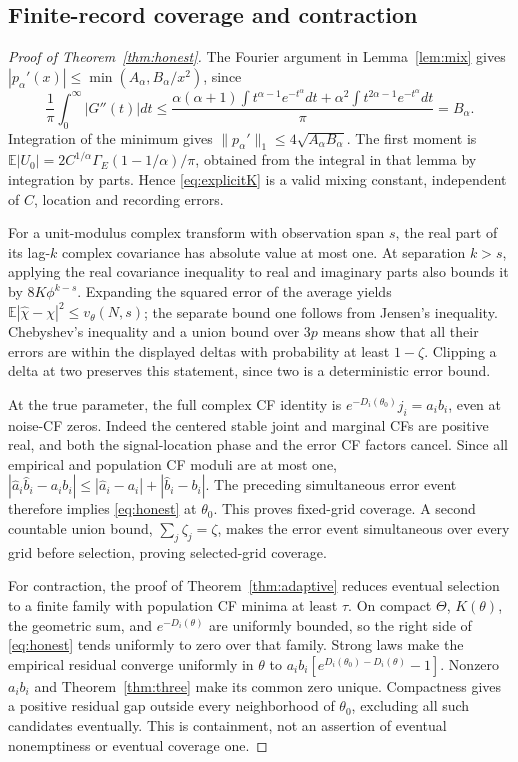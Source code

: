 \documentclass[11pt,a4paper]{article}
\theoremstyle{remark}\newtheorem{remark}[theorem]{Remark}
\newcommand{\E}{\mathbb E}\newcommand{\Pp}{\mathbb P}
\begin{document}
\subsection{Finite-record coverage and contraction}\label{proof:honest}
\begin{proof}[Proof of Theorem~\ref{thm:honest}]
The Fourier argument in Lemma~\ref{lem:mix} gives
$|p_\alpha'(x)|\le\min(A_\alpha,B_\alpha/x^2)$, since
\[
\frac1\pi\int_0^\infty|G''(t)|dt
\le\frac{\alpha(\alpha+1)\int t^{\alpha-1}e^{-t^\alpha}dt+
\alpha^2\int t^{2\alpha-1}e^{-t^\alpha}dt}{\pi}=B_\alpha.
\]
Integration of the minimum gives $\|p_\alpha'\|_1\le4\sqrt{A_\alpha B_\alpha}$. The first moment is
$\E|U_0|=2C^{1/\alpha}\Gamma_{\!E}(1-1/\alpha)/\pi$, obtained from the integral in that lemma by integration by parts. Hence \eqref{eq:explicitK} is a valid mixing constant, independent of $C$, location and recording errors.

For a unit-modulus complex transform with observation span $s$, the real part of its lag-$k$ complex covariance has absolute value at most one. At separation $k>s$, applying the real covariance inequality to real and imaginary parts also bounds it by $8K\phi^{k-s}$. Expanding the squared error of the average yields
$\E|\widehat\chi-\chi|^2\le v_\theta(N,s)$; the separate bound one follows from Jensen's inequality. Chebyshev's inequality and a union bound over $3p$ means show that all their errors are within the displayed deltas with probability at least $1-\zeta$. Clipping a delta at two preserves this statement, since two is a deterministic error bound.

At the true parameter, the full complex CF identity is
$e^{-D_i(\theta_0)}j_i=a_ib_i$, even at noise-CF zeros. Indeed the centered stable joint and marginal CFs are positive real, and both the signal-location phase and the error CF factors cancel. Since all empirical and population CF moduli are at most one,
$|\widehat a_i\widehat b_i-a_ib_i|\le|\widehat a_i-a_i|+|\widehat b_i-b_i|$.
The preceding simultaneous error event therefore implies \eqref{eq:honest} at $\theta_0$. This proves fixed-grid coverage. A second countable union bound, $\sum_j\zeta_j=\zeta$, makes the error event simultaneous over every grid before selection, proving selected-grid coverage.

For contraction, the proof of Theorem~\ref{thm:adaptive} reduces eventual selection to a finite family with population CF minima at least $\tau$. On compact $\Theta$, $K(\theta)$, the geometric sum, and $e^{-D_i(\theta)}$ are uniformly bounded, so the right side of \eqref{eq:honest} tends uniformly to zero over that family. Strong laws make the empirical residual converge uniformly in $\theta$ to
$a_ib_i[e^{D_i(\theta_0)-D_i(\theta)}-1]$.
Nonzero $a_ib_i$ and Theorem~\ref{thm:three} make its common zero unique. Compactness gives a positive residual gap outside every neighborhood of $\theta_0$, excluding all such candidates eventually. This is containment, not an assertion of eventual nonemptiness or eventual coverage one.
\end{proof}
\end{document}
